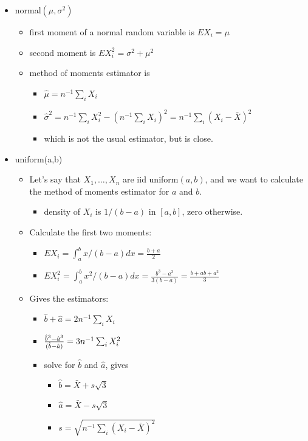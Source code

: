 \documentclass[11pt]{article}
\begin{document}
\begin{itemize}
\item normal$(\mu,\sigma^2)$
\begin{itemize}
\item first moment of a normal random variable is $E X_i = \mu$
\item second moment is $E X_i^2 = \sigma^2 + \mu^2$
\item method of moments estimator is
\begin{itemize}
\item $\hat \mu = n^{-1} \sum_i X_i$
\item $\hat \sigma^2 = n^{-1} \sum_i X_i^2 - (n^{-1}\sum_i X_i)^2
           = n^{-1} \sum_i(X_i - \bar X)^2$
\item which is not the usual estimator, but is close.
\end{itemize}
\end{itemize}
\item uniform(a,b)
\begin{itemize}
\item Let's say that $X_1,\dots,X_n$ are iid uniform$(a,b)$, and we want
         to calculate the method of moments estimator for $a$ and $b$.
\begin{itemize}
\item density of $X_i$ is $1/(b-a)$ in $[a,b]$, zero otherwise.
\end{itemize}
\item Calculate the first two moments:
\begin{itemize}
\item $E X_i = \int_a^b x /(b-a) dx = \frac{b+a}{2}$
\item $E X_i^2 = \int_a^b x^2 /(b-a) dx = \frac{b^3 - a^3}{3(b - a)} = \frac{b + ab + a^2}{3}$
\end{itemize}
\item Gives the estimators:
\begin{itemize}
\item $\hat b+\hat a = 2 n^{-1} \sum_i X_i$
\item ${\hat b^3-\hat a^3 \over (\hat b- \hat a)} = 3 n^{-1} \sum_i X_i^2$
\item solve for $\hat b$ and $\hat a$, gives
\begin{itemize}
\item $\hat b = \bar X + s \sqrt{3}$
\item $\hat a = \bar X - s \sqrt{3}$
\item $s = \sqrt{n^{-1} \sum_i (X_i - \bar X)^2}$
\end{itemize}

\end{itemize}
\end{itemize}
\end{itemize}
\end{document}
